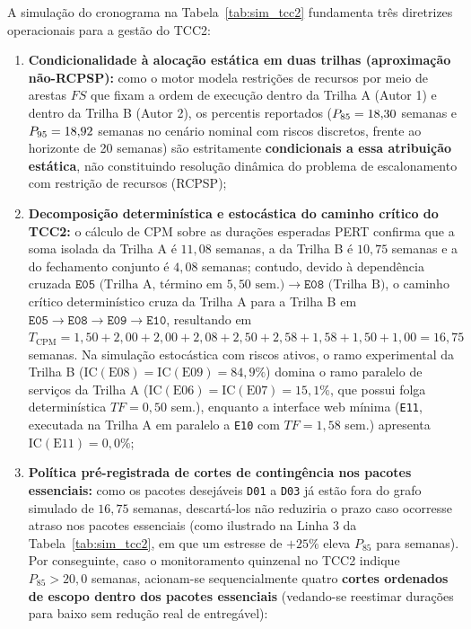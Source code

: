 \documentclass[12pt,openany,oneside,a4paper,english,brazilian,sumario=tradicional]{abntex2}
\newcommand{\IC}{\mathrm{IC}}
\begin{document}
A simulação do cronograma na Tabela~\ref{tab:sim_tcc2} fundamenta três diretrizes operacionais para a gestão do TCC2:
\begin{enumerate}
  \item \textbf{Condicionalidade à alocação estática em duas trilhas (aproximação não-RCPSP):} como o motor modela restrições de recursos por meio de arestas $FS$ que fixam a ordem de execução dentro da Trilha A (Autor 1) e dentro da Trilha B (Autor 2), os percentis reportados ($P_{85}=18{,}30{}$ semanas e $P_{95}=18{,}92{}$ semanas no cenário nominal com riscos discretos, frente ao horizonte de 20 semanas) são estritamente \textbf{condicionais a essa atribuição estática}, não constituindo resolução dinâmica do problema de escalonamento com restrição de recursos (RCPSP);
  \item \textbf{Decomposição determinística e estocástica do caminho crítico do TCC2:} o cálculo de CPM sobre as durações esperadas PERT confirma que a soma isolada da Trilha A é $11{,}08$ semanas, a da Trilha B é $10{,}75$ semanas e a do fechamento conjunto é $4{,}08$ semanas; contudo, devido à dependência cruzada $\texttt{E05}\text{ (Trilha A, término em }5{,}50\text{ sem.)} \rightarrow \texttt{E08}\text{ (Trilha B)}$, o caminho crítico determinístico cruza da Trilha A para a Trilha B em $\texttt{E05}\rightarrow\texttt{E08}\rightarrow\texttt{E09}\rightarrow\texttt{E10}$, resultando em $T_{\mathrm{CPM}} = 1{,}50 + 2{,}00 + 2{,}00 + 2{,}08 + 2{,}50 + 2{,}58 + 1{,}58 + 1{,}50 + 1{,}00 = 16{,}75$ semanas. Na simulação estocástica com riscos ativos, o ramo experimental da Trilha B ($\IC(\text{E08})=\IC(\text{E09})=84{,}9\%$) domina o ramo paralelo de serviços da Trilha A ($\IC(\text{E06})=\IC(\text{E07})=15{,}1\%$, que possui folga determinística $TF=0{,}50$ sem.), enquanto a interface web mínima (\texttt{E11}, executada na Trilha A em paralelo a \texttt{E10} com $TF=1{,}58$ sem.) apresenta $\IC(\text{E11}) = 0{,}0\%$;
  \item \textbf{Política pré-registrada de cortes de contingência nos pacotes essenciais:} como os pacotes desejáveis \texttt{D01} a \texttt{D03} já estão fora do grafo simulado de $16{,}75$ semanas, descartá-los não reduziria o prazo caso ocorresse atraso nos pacotes essenciais (como ilustrado na Linha 3 da Tabela~\ref{tab:sim_tcc2}, em que um estresse de $+25\%$ eleva $P_{85}$ para \tccDoisStressPoitentaeCinco{} semanas). Por conseguinte, caso o monitoramento quinzenal no TCC2 indique $P_{85} > 20{,}0$ semanas, acionam-se sequencialmente quatro \textbf{cortes ordenados de escopo dentro dos pacotes essenciais} (vedando-se reestimar durações para baixo sem redução real de entregável):

\end{enumerate}
\end{document}
